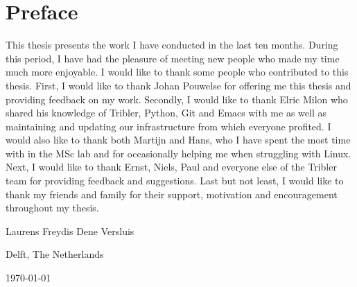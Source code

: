 \chapter*{Preface}
This thesis presents the work I have conducted in the last ten months.
During this period, I have had the pleasure of meeting new people who made my time much more enjoyable.
I would like to thank some people who contributed to this thesis.
First, I would like to thank Johan Pouwelse for offering me this thesis and providing feedback on my work.
Secondly, I would like to thank Elric Milon who shared his knowledge of Tribler, Python, Git and Emacs with me as well as maintaining and updating our infrastructure from which everyone profited.
I would also like to thank both Martijn and Hans, who I have spent the most time with in the MSc lab and for occasionally helping me when struggling with Linux.
Next, I would like to thank Ernst, Niels, Paul and everyone else of the Tribler team for providing feedback and suggestions.
Last but not least, I would like to thank my friends and family for their support, motivation and encouragement throughout my thesis.

\vspace{1\baselineskip}

\noindent
Laurens Freydis Dene Versluis

\vspace{1\baselineskip}

\noindent
Delft, The Netherlands

\noindent
\today